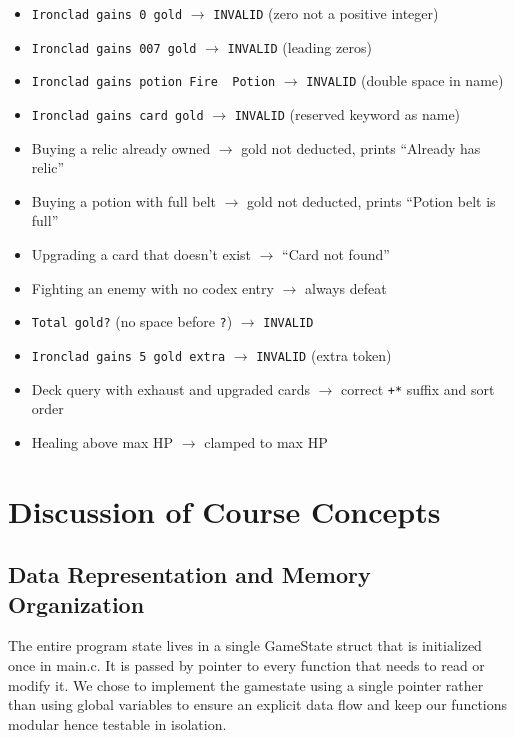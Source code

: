 \documentclass[12pt,a4paper]{article}
\begin{document}
\begin{itemize}
    \item \texttt{Ironclad gains 0 gold} $\rightarrow$ \texttt{INVALID} (zero not a positive integer)
    \item \texttt{Ironclad gains 007 gold} $\rightarrow$ \texttt{INVALID} (leading zeros)
    \item \texttt{Ironclad gains potion Fire\ \ Potion} $\rightarrow$ \texttt{INVALID} (double space in name)
    \item \texttt{Ironclad gains card gold} $\rightarrow$ \texttt{INVALID} (reserved keyword as name)
    \item Buying a relic already owned $\rightarrow$ gold not deducted, prints ``Already has relic''
    \item Buying a potion with full belt $\rightarrow$ gold not deducted, prints ``Potion belt is full''
    \item Upgrading a card that doesn't exist $\rightarrow$ ``Card not found''
    \item Fighting an enemy with no codex entry $\rightarrow$ always defeat
    \item \texttt{Total gold?} (no space before \texttt{?}) $\rightarrow$ \texttt{INVALID}
    \item \texttt{Ironclad gains 5 gold extra} $\rightarrow$ \texttt{INVALID} (extra token)
    \item Deck query with exhaust and upgraded cards $\rightarrow$ correct \texttt{+*} suffix and sort order
    \item Healing above max HP $\rightarrow$ clamped to max HP
\end{itemize}

\section{Discussion of Course Concepts}

\subsection{Data Representation and Memory Organization}

The entire program state lives in a single GameState struct that is initialized once in main.c. It is passed by pointer to every function that needs to read or modify it. We chose to implement the gamestate using a single pointer rather than using global variables to ensure an explicit data flow and keep our functions modular hence testable in isolation.
\end{document}
